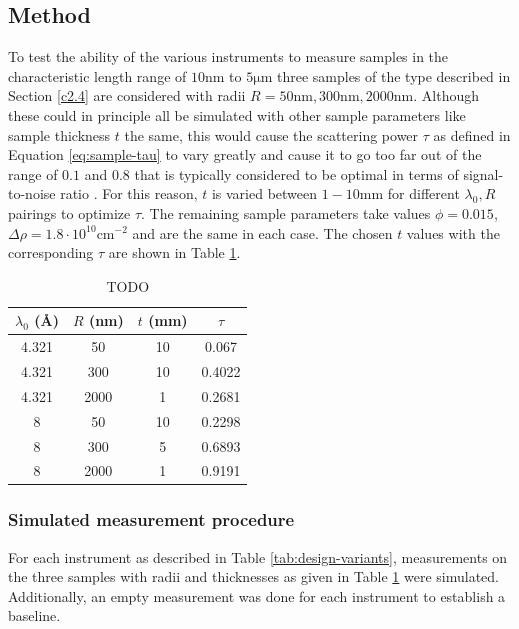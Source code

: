 \documentclass{article}
\newcommand{\targetrange}{$10 \unit{\nano\meter}$ to $5 \unit{\micro\meter}$ }
\begin{document}
\subsection{Method}
To test the ability of the various instruments to measure samples in the characteristic length range of \targetrange three samples of the type described in Section \ref{c2.4} are considered with radii $R = 50\unit{\nano\meter}, 300\unit{\nano\meter}, 2000\unit{\nano\meter}$. Although these could in principle all be simulated with other sample parameters like sample thickness $t$ the same, this would cause the scattering power $\tau$ as defined in Equation \eqref{eq:sample-tau} to vary greatly and cause it to go too far out of the range of $0.1$ and $0.8$ that is typically considered to be optimal in terms of signal-to-noise ratio \cite{bouwman2021b}\cite{heijkamp2011}. For this reason, $t$ is varied between $1 - 10\unit{\milli\meter}$ for different $\lambda_0, R$ pairings to optimize $\tau$. The remaining sample parameters take values $\phi = 0.015$, $\Delta\rho = 1.8\cdot 10^{10} \unit{\centi\meter}^{-2}$ and are the same in each case. The chosen $t$ values with the corresponding $\tau$ are shown in Table \ref{tab:sample-thickness}.


\begin{table}[h!]
	\centering
	\begin{tabular}{|c|c|c|c|}
		\hline
		$\lambda_0$ (Å)  & $R$ (nm)  & $t$ (mm)& $\tau$ \\
		\hline
		4.321 & 50 & 10 & 0.067\\
		4.321 & 300 & 10 & 0.4022 \\
		4.321 & 2000 & 1 & 0.2681 \\
		8 & 50 & 10 & 0.2298 \\
		8 & 300 & 5 & 0.6893 \\
		8 & 2000 & 1 & 0.9191 \\
		\hline
	\end{tabular}
	\caption{TODO}
	\label{tab:sample-thickness}
\end{table}
\subsubsection{Simulated measurement procedure}
For each instrument as described in Table \ref{tab:design-variants}, measurements on the three samples with radii and thicknesses as given in Table \ref{tab:sample-thickness} were simulated. Additionally, an empty measurement was done for each instrument to establish a baseline. 
\end{document}
